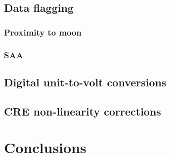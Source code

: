 \documentclass{aa}
\begin{document}
\subsection{Data flagging}
\subsubsection{Proximity to moon}
\subsubsection{SAA}
\subsection{Digital unit-to-volt conversions}
\subsection{CRE non-linearity corrections}

\section{Conclusions}




\end{document}
